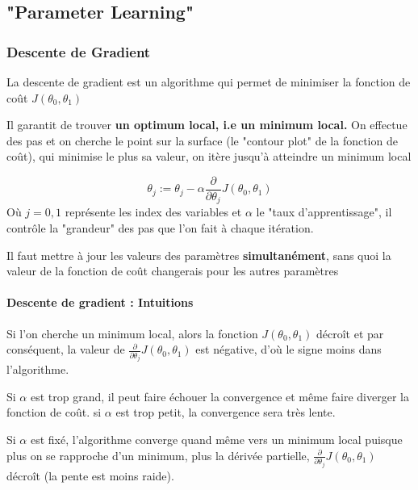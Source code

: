 \documentclass{article}
\theoremstyle{definition}
\begin{document}
\subsection{"Parameter Learning"}
\subsubsection{Descente de Gradient}
La descente de gradient est un algorithme qui permet de minimiser la fonction de coût $J(\theta_0,\theta_1)$\par
Il garantit de trouver \textbf{un optimum local, i.e un minimum local.} On effectue des pas et on cherche le point sur la surface (le "contour plot" de la fonction de coût), qui minimise le plus sa valeur, on itère jusqu'à atteindre un minimum local\par
\begin{equation} \label{eu_eqn}
\theta_j:=\theta_j - \alpha\frac{\partial }{\partial \theta_j}J(\theta_0,\theta_1)
\end{equation}
Où $j= 0,1$ représente les index des variables et $\alpha$ le "taux d'apprentissage", il contrôle la "grandeur" des pas que l'on fait à chaque itération. \par 
Il faut mettre à jour les valeurs des paramètres \textbf{simultanément}, sans quoi la valeur de la fonction de coût changerais pour les autres paramètres \par
\paragraph{Descente de gradient : Intuitions}
Si l'on cherche un minimum local, alors la fonction $J(\theta_0,\theta_1)$ décroît et par conséquent, la valeur de $\frac{\partial }{\partial \theta_j}J(\theta_0,\theta_1)$  est négative, d'où le signe moins dans l'algorithme.\par
Si $\alpha$ est trop grand, il peut faire échouer la convergence et même faire diverger la fonction de coût. si $\alpha$ est trop petit, la convergence sera très lente.\par 
Si $\alpha$ est fixé, l'algorithme converge quand même vers un minimum local puisque plus on se rapproche d'un minimum, plus la dérivée partielle, $\frac{\partial }{\partial \theta_j}J(\theta_0,\theta_1)$ décroît (la pente est moins raide).\par
\end{document}
